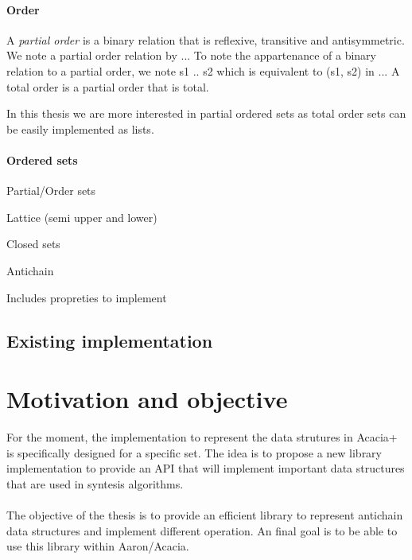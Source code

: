 \documentclass[letterpaper]{article}
\begin{document}
\paragraph{Order}

A \textit{partial order} is a binary relation that is reflexive,
transitive and antisymmetric. We note a
partial order relation by ... To note the appartenance of a binary
relation to a partial order, we note s1 .. s2 which is equivalent
to (s1, s2) in ...
A total order is a partial order that is total.

In this thesis we are more interested in partial ordered sets as
total order sets can be easily implemented as lists.

\paragraph{Ordered sets}

Partial/Order sets

Lattice (semi upper and lower)

Closed sets

Antichain

Includes propreties to implement

\subsection{Existing implementation}



\section{Motivation and objective}

For the moment, the implementation to represent the data strutures in
 Acacia+
is specifically designed for a specific set. The idea is to propose a new
library implementation to provide an API that will implement important
data structures that are used in syntesis algorithms.

\paragraph{}

The objective of the thesis is to provide an efficient library to represent
antichain data structures and implement different operation. An final
goal is to be able to use this library within Aaron/Acacia.
\end{document}
